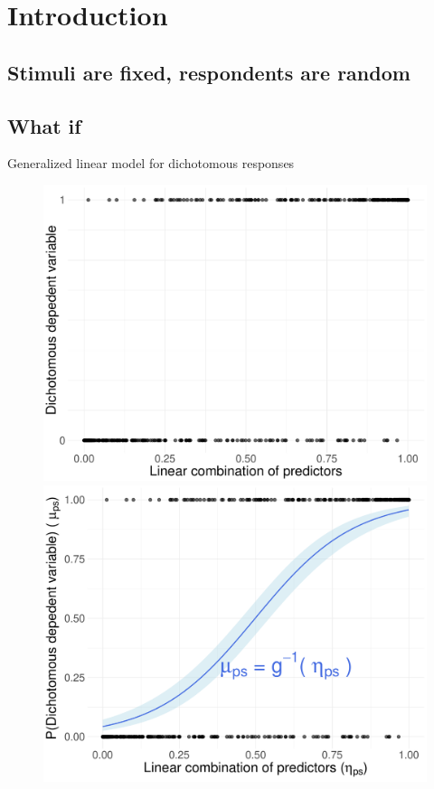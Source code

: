 \documentclass[compress]{beamer}
\begin{document}
\section{Introduction}

\subsection{Stimuli are fixed, respondents are random}

\subsection{What if}



\begin{frame}{Generalized linear model for dichotomous responses}
	
	\begin{figure}
		\begin{overprint}
			\includegraphics[width=0.7\linewidth]{img/baseGLM.pdf}
			\onslide<2>\includegraphics[width=0.7\linewidth]{img/linkGLM.pdf}
		\end{overprint}
	\end{figure}
	

\end{frame}
\end{document}
